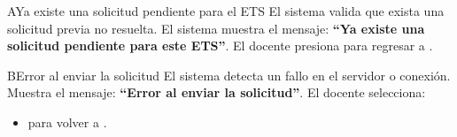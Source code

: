 \begin{UCtrayectoriaA}{A}{Ya existe una solicitud pendiente para el ETS}
	\UCpaso El sistema valida que exista una solicitud previa no resuelta.
	\UCpaso El sistema muestra el mensaje: {\bf``Ya existe una solicitud pendiente para este ETS''}.
	\UCpaso[\UCactor] El docente presiona  para regresar a .
\end{UCtrayectoriaA}
\begin{UCtrayectoriaA}{B}{Error al enviar la solicitud}
	\UCpaso El sistema detecta un fallo en el servidor o conexión.
	\UCpaso Muestra el mensaje: {\bf``Error al enviar la solicitud''}.
	\UCpaso[\UCactor] El docente selecciona:
	\begin{itemize}
		\item {} para volver a .
	\end{itemize}
\end{UCtrayectoriaA}
